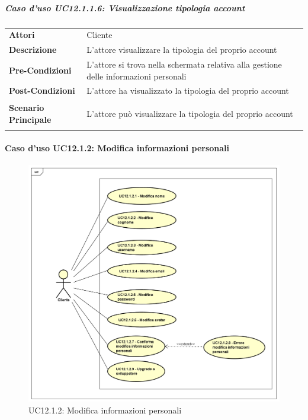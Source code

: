 \subparagraph{Caso d'uso UC12.1.1.6: Visualizzazione tipologia account}
\label{UC12_1_1_6}

\begin{minipage}{\linewidth}
	\begin{tabular}{ l | p{11cm}}
		\hline
		\rowcolor{Gray}
		\multicolumn{2}{c}{UC12.1.1.6 - Visualizzazione tipologia account} \\
		\hline
		\textbf{Attori} & Cliente \\
		\textbf{Descrizione} & L'attore visualizzare la tipologia del proprio account \\
		\textbf{Pre-Condizioni} & L'attore si trova nella schermata relativa alla gestione delle informazioni personali \\
		\textbf{Post-Condizioni} & L'attore ha visualizzato la tipologia del proprio account \\
		\textbf{Scenario Principale} & 
		\begin{enumerate*}[label=(\arabic*.),itemjoin={\newline}]
			\item L'attore può visualizzare la tipologia del proprio account
		\end{enumerate*}
	\end{tabular}
\end{minipage}

\newpage
\paragraph{Caso d'uso UC12.1.2: Modifica informazioni personali}
\label{UC12_1_2}
\begin{figure}[ht]
	\centering
	\includegraphics[scale=0.45]{UML/UC12_1_2.png}
	\caption{UC12.1.2: Modifica informazioni personali}
\end{figure}

